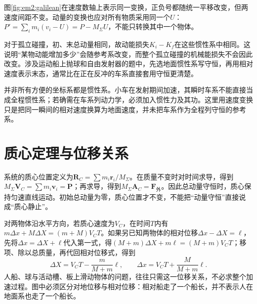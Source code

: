 图\ref{fig:em2:galilean}在速度数轴上表示同一变换，正负号都随统一平移改变，但两速度间距不变。动量的变换也应对所有物质采用同一个$U$：$P'=\sum_i m_i(v_i-U)=P-M_\Sigma U$，不能只转换其中一个物体。


对于孤立碰撞，初、末总动量相同，故动能损失$K_i-K_f$在这些惯性系中相同。这说明“某物动能增加多少”会随参考系改变，而整个孤立碰撞的机械能损失不会因此改变。涉及运动船上抛球和自由发射器的题中，先选地面惯性系写守恒，再用相对速度表示末态，通常比在正在反冲的车系直接套用守恒更清楚。

并非所有方便的坐标系都是惯性系。小车在发射期间加速，其瞬时车系不能直接当成全程惯性系；若确需在车系列动力学，必须加入惯性力及其功。这里用速度变换只是把同一瞬间的相对速度换算为地面速度，并未把车系作为全程列守恒的参考系。

\section{质心定理与位移关系}

系统的质心位置定义为$\bm R_C=\sum m_i\bm r_i/M_{\Sigma}$。在质量不变时对时间求导，得到$M_{\Sigma}\bm V_C=\sum m_i\bm v_i=\bm P$；再求导，得到$M_{\Sigma}\bm A_C=\bm F_{\text{外}}$。因此总动量守恒时，质心保持匀速直线运动。初始总动量为零，质心位置才不变，不能把“动量守恒”直接说成“质心静止”。

对两物体沿水平方向，若质心速度为$V_C$，在时间$T$内有$m\Delta x+M\Delta X=(m+M)V_CT$。如果另已知两物体的相对位移$\Delta x-\Delta X=\ell$，先将$\Delta x=\Delta X+\ell$代入第一式，得$(M+m)\Delta X+m\ell=(M+m)V_CT$；移项、除以总质量，再代回相对位移式，得到
\[\Delta X=V_CT-\frac{m}{M+m}\ell,\qquad \Delta x=V_CT+\frac{M}{M+m}\ell.\]
人船、球与活动槽、板上滑动物体的问题，往往只需这一位移关系，不必求整个加速过程。图中必须区分对地位移与相对位移：相对船走了一个船长，并不表示人在地面系也走了一个船长。

